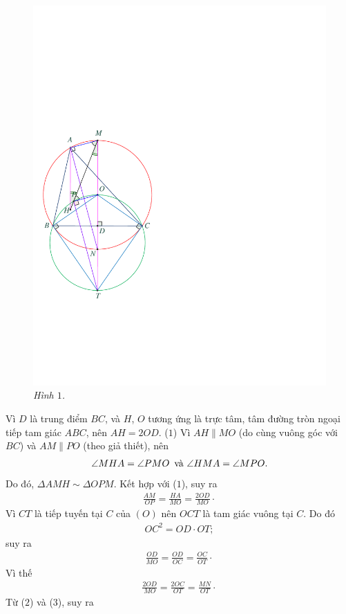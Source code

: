 \begin{multicols}{2}
\begin{figure}[H]
		\includegraphics[width=0.68\linewidth]{P619H1}
		\caption{\small\textit{\color{thachthuctoanhoc}Hình $1$.}}
		\vspace*{-10pt}
	\end{figure}
	Vì $D$ là trung điểm $BC$, và $H$, $O$ tương ứng là trực tâm, tâm đường tròn ngoại tiếp tam giác $ABC$, nên $AH = 2OD$. \hfill ($1$)
	\vskip 0.05cm
	Vì $AH \parallel MO$ (do cùng vuông góc với $BC$) và $AM \parallel PO$ (theo giả thiết), nên
	\begin{align*}
		\angle MHA = \angle PMO \text{\color{black}\, và } \angle HMA = \angle MPO.
	\end{align*}
	Do đó, $\Delta AMH \sim \Delta OPM$. Kết hợp với ($1$), suy ra
	\begin{align*}
		\frac{{AM}}{{OP}} = \frac{{HA}}{{MO}} = \frac{{2OD}}{{MO}} \cdot \tag{$2$}
	\end{align*}
	Vì $CT$ là tiếp tuyến tại $C$ của $(O)$ nên $OCT$ là tam giác vuông tại $C$. Do đó
	\begin{align*}
		O{C^2} = OD \cdot OT;
	\end{align*}
	suy ra
	\begin{align*}
		\frac{{OD}}{{MO}} = \frac{{OD}}{{OC}} = \frac{{OC}}{{OT}} \cdot
	\end{align*}
	Vì thế
	\begin{align*}
		\frac{{2OD}}{{MO}} = \frac{{2OC}}{{OT}} = \frac{{MN}}{{OT}} \cdot \tag{$3$}
	\end{align*}
	Từ ($2$) và ($3$), suy ra

\end{multicols}
